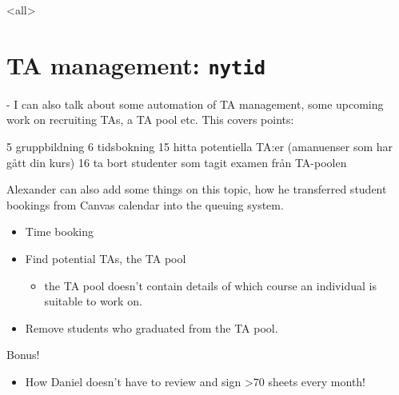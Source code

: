 \mode<all>{}



\section[TA management]{TA management: \texttt{nytid}}

- I can also talk about some automation of TA management, some upcoming
work on recruiting TAs, a TA pool etc. This covers points:

5 gruppbildning
6 tidsbokning
15 hitta potentiella TA:er (amanuenser som har gått din kurs)
16 ta bort studenter som tagit examen från TA-poolen


Alexander can also add some things on this topic, how he transferred
student bookings from Canvas calendar into the queuing system.

\begin{frame}[fragile]\label{WishTA}
  \begin{example}
    \begin{itemize}
      \item {Time booking}

      \item {Find potential TAs, the TA pool}
        \begin{itemize}
          \item {the TA pool doesn't contain details of which course an 
            individual is suitable to work on.}
        \end{itemize}

      \item {Remove students who graduated from the TA pool.}
    \end{itemize}
  \end{example}

  \pause

  \begin{block}{Bonus!}
    \begin{itemize}
      \item How Daniel doesn't have to review and sign >70 sheets every month!
    \end{itemize}
  \end{block}
\end{frame}

